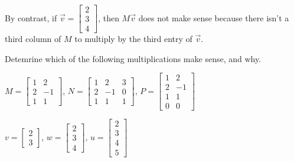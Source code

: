 \documentclass{ximera}
\begin{document}
\begin{exploration}
\begin{example}
        By contrast, if $\vec{v}= \begin{bmatrix} 2 \\ 3 \\ 4 \end{bmatrix}$, then $M\vec{v}$ does not make sense because there isn't a third column of $M$ to multiply by the third entry of $\vec{v}$.


        Detemrine which of the following multiplications make sense, and why.

        $M=\begin{bmatrix} 1 & 2 \\ 2&-1 \\ 1 & 1\end{bmatrix}$, $N=\begin{bmatrix} 1 & 2 & 3 \\ 2&-1 & 0 \\ 1 & 1 & 1\end{bmatrix}$, $P=\begin{bmatrix} 1 & 2 \\ 2&-1 \\ 1 & 1 \\ 0 & 0\end{bmatrix}$

        $v=\begin{bmatrix} 2 \\ 3 \end{bmatrix}$,
        $w=\begin{bmatrix} 2 \\ 3 \\ 4 \end{bmatrix}$, $u=\begin{bmatrix} 2 \\ 3 \\ 4 \\ 5 \end{bmatrix}$


\end{example}
\end{exploration}
\end{document}
